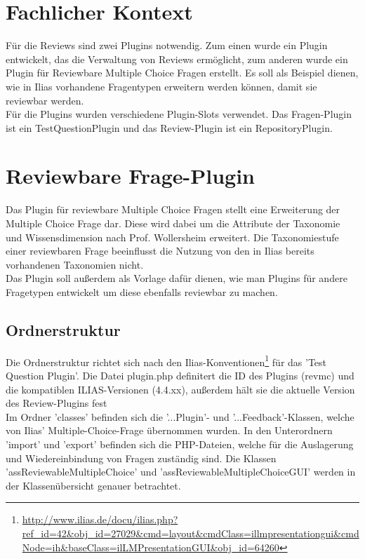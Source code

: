 \documentclass[a4paper]{scrreprt}
\begin{document}
\section{Fachlicher Kontext}
Für die Reviews sind zwei Plugins notwendig. 
Zum einen wurde ein Plugin entwickelt, das die Verwaltung von Reviews ermöglicht, zum anderen wurde ein Plugin für Reviewbare Multiple Choice Fragen erstellt. Es soll als Beispiel dienen, wie in Ilias vorhandene Fragentypen erweitern werden können, damit sie reviewbar werden.\\
Für die Plugins wurden verschiedene Plugin-Slots verwendet. 
Das Fragen-Plugin ist ein TestQuestionPlugin und das Review-Plugin ist ein RepositoryPlugin.\\ 

\section{Reviewbare Frage-Plugin}
Das Plugin für reviewbare Multiple Choice Fragen stellt eine Erweiterung der Multiple Choice Frage dar. Diese wird dabei um die Attribute der Taxonomie und Wissensdimension nach Prof. Wollersheim erweitert. Die Taxonomiestufe einer reviewbaren Frage beeinflusst die Nutzung von den in Ilias bereits vorhandenen Taxonomien nicht. \\
Das Plugin soll außerdem als Vorlage dafür dienen, wie man Plugins für andere Fragetypen entwickelt um diese ebenfalls reviewbar zu machen. \\

\subsection{Ordnerstruktur}
Die Ordnerstruktur richtet sich nach den Ilias-Konventionen\footnote{\url{http://www.ilias.de/docu/ilias.php?ref_id=42&obj_id=27029&cmd=layout&cmdClass=illmpresentationgui&cmdNode=ih&baseClass=ilLMPresentationGUI&obj_id=64260}} für das 'Test Question Plugin'. Die Datei plugin.php definitert die ID des Plugins (revmc) und die kompatiblen ILIAS-Versionen (4.4.xx), außerdem hält sie die aktuelle Version des Review-Plugins fest\\
Im Ordner 'classes' befinden sich die '...Plugin'- und '...Feedback'-Klassen, welche von Ilias' Multiple-Choice-Frage übernommen wurden. In den Unterordnern 'import' und 'export' befinden sich die PHP-Dateien, welche für die Auslagerung und Wiedereinbindung von Fragen zuständig sind. Die Klassen 'assReviewableMultipleChoice' und 'assReviewableMultipleChoiceGUI' werden in der Klassenübersicht genauer betrachtet.\\
\end{document}
